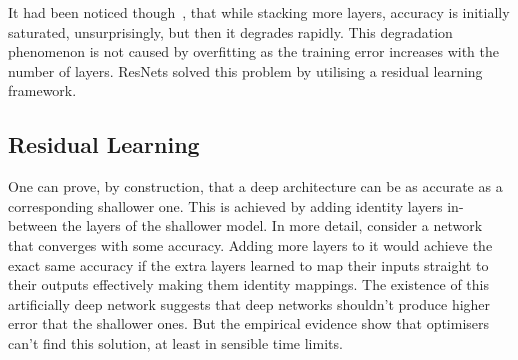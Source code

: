 \documentclass{article}
\begin{document}
    It had been noticed though~\cite{srivastava2015highway}, that while stacking more layers, accuracy is initially saturated, unsurprisingly, but then it degrades rapidly.
    This degradation phenomenon is not caused by overfitting as the training error increases with the number of layers.
    ResNets solved this problem by utilising a residual learning framework.

    \subsection{Residual Learning}
    One can prove, by construction, that a deep architecture can be as accurate as a corresponding shallower one.
    This is achieved by adding identity layers in-between the layers of the shallower model.
    In more detail, consider a network that converges with some accuracy.
    Adding more layers to it would achieve the exact same accuracy if the extra layers learned to map their inputs straight to their outputs effectively making them identity mappings.
    The existence of this artificially deep network suggests that deep networks shouldn't produce higher error that the shallower ones.
    But the empirical evidence show that optimisers can't find this solution, at least in sensible time limits.
\end{document}
